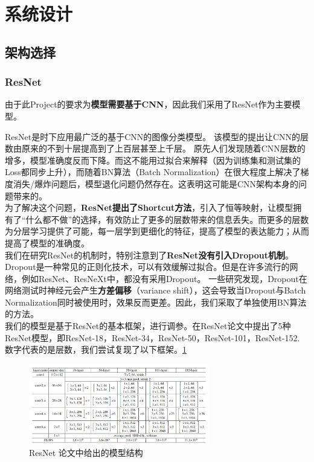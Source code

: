 \documentclass[hyperref, UTF8, 12pt]{article}
\theoremstyle{definition}
\begin{document}
\section{系统设计}
\subsection{架构选择}
\subsubsection{ResNet}
由于此Project的要求为\textbf{模型需要基于CNN}，因此我们采用了ResNet作为主要模型。

ResNet是时下应用最广泛的基于CNN的图像分类模型。\cite{he2015deep} 该模型的提出让CNN的层数由原来的不到十层提高到了上百层甚至上千层。
原先人们发现随着CNN层数的增多，模型准确度反而下降。而这不能用过拟合来解释（因为训练集和测试集的Loss都同步上升），而随着BN算法（Batch Normalization）在很大程度上解决了梯度消失/爆炸问题后\cite{batch}，模型退化问题仍然存在。这表明这可能是CNN架构本身的问题带来的。
\\ 
\indent
为了解决这个问题，\textbf{ResNet提出了Shortcut方法}，引入了恒等映射，让模型拥有了“什么都不做”的选择，有效防止了更多的层数带来的信息丢失。而更多的层数为分层学习提供了可能，每一层学到更细化的特征，提高了模型的表达能力；从而提高了模型的准确度。\cite{resnet2016}
\\ 
\indent
我们在研究ResNet的机制时，特别注意到了\textbf{ResNet没有引入Dropout机制}。Dropout是一种常见的正则化技术，可以有效缓解过拟合。\cite{dropout2014}但是在许多流行的网络，例如ResNet\cite{he2015deep}、ResNeXt\cite{xie2017aggregated}中，都没有采用Dropout。
一些研究发现，Dropout在网络测试时神经元会产生\textbf{方差偏移}（variance shift），这会导致当Dropout与Batch Normalization同时被使用时，效果反而更差。\cite{li2019understanding}因此，我们采取了单独使用BN算法的方法。
\\ 
\indent
我们的模型是基于ResNet的基本框架，进行调参。在ResNet论文\cite{he2015deep}中提出了5种ResNet模型，即ResNet-18，ResNet-34，ResNet-50，ResNet-101，ResNet-152. 数字代表的是层数，我们尝试复现了以下框架。\ref{Fig.resnet1}
\begin{figure}[h] %
	\centering %
	\includegraphics[width=0.7\textwidth]{resnet.png} %
	\caption{ResNet 论文中给出的模型结构} %
	\label{Fig.resnet1} %
\end{figure}
\end{document}
